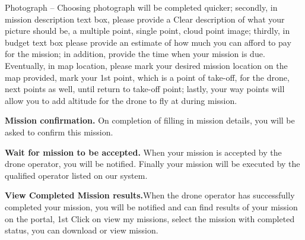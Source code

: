 \documentclass{article}
\begin{document}
\begin{useritems}
			\item{Photograph} – Choosing photograph will be completed quicker; secondly, in mission description text box, please provide a 
			Clear description of what your picture should be, a multiple point, single point, cloud point image; thirdly, in budget text box please provide an estimate of how much you can afford to pay for the mission; in addition, provide the time when your mission is due. Eventually, in map location, please mark your desired mission location on the map provided, mark your 1st point, which is a point of take-off, for the drone, next points as well, until return to take-off point; lastly, your way points will allow you to add altitude for the drone to fly at during mission.   
			
			
			\item{\bfseries Mission confirmation. } On completion of filling in mission details, you will be asked to confirm this mission.
			
			
			\item{\bfseries Wait for mission to be accepted.} When your mission is accepted by the drone operator, you will be notified.  Finally your mission will be executed by the qualified operator listed on our system. 
			
			\item{\bfseries View Completed Mission results.}When the drone operator has successfully completed your mission, you will be notified and can find results of your mission on the portal, 1st Click on view my
			missions, select the mission with completed status, you can download or view mission.
		\end{useritems}
		
		
	
\end{document}
